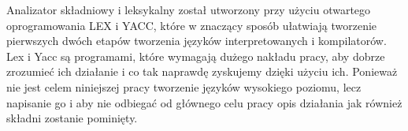 Analizator składniowy i leksykalny został utworzony przy użyciu otwartego oprogramowania LEX i YACC, 
 które w znaczący sposób ułatwiają tworzenie pierwszych dwóch etapów tworzenia języków interpretowanych i kompilatorów.
Lex i Yacc są programami,
 które wymagają dużego nakładu pracy,
 aby dobrze zrozumieć ich działanie
 i co tak naprawdę zyskujemy dzięki użyciu ich.
Ponieważ nie jest celem niniejszej pracy tworzenie języków wysokiego poziomu,
 lecz napisanie go i aby nie odbiegać od głównego celu pracy
 opis działania jak również składni zostanie pominięty.

  
